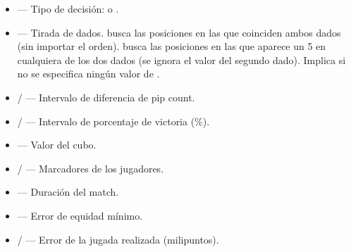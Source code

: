 \documentclass[letterpaper,10pt,spanish]{sphinxmanual}
\begin{document}
\sphinxAtStartPar
{}
\begin{itemize}
\item {} 
\sphinxAtStartPar
{} — Tipo de decisión:  o .

\item {} 
\sphinxAtStartPar
{} — Tirada de dados.  busca las posiciones en las que coinciden ambos dados (sin importar el orden).  busca las posiciones en las que aparece un 5 en cualquiera de los dos dados (se ignora el valor del segundo dado). Implica  si no se especifica ningún valor de .

\item {} 
\sphinxAtStartPar
{} /  — Intervalo de diferencia de pip count.

\item {} 
\sphinxAtStartPar
{} /  — Intervalo de porcentaje de victoria (\%).

\item {} 
\sphinxAtStartPar
{} — Valor del cubo.

\item {} 
\sphinxAtStartPar
{} /  — Marcadores de los jugadores.

\item {} 
\sphinxAtStartPar
{} — Duración del match.

\item {} 
\sphinxAtStartPar
{} — Error de equidad mínimo.

\item {} 
\sphinxAtStartPar
{} /  — Error de la jugada realizada (milipuntos).


\end{itemize}
\end{document}
